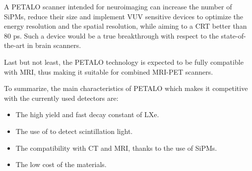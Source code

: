\documentclass[review]{elsarticle}
\begin{document}
A PETALO scanner intended for neuroimaging can increase the number of SiPMs, reduce their size and implement VUV sensitive devices to optimize the energy resolution and the spatial resolution, while aiming to a  CRT  better than 80 ps. Such a device would be a true breakthrough with respect to the state-of-the-art in brain scanners. 

Last but not least, the PETALO technology is expected to be fully compatible with MRI, thus making it suitable for combined MRI-PET scanners. 

To summarize, the main characteristics of PETALO which makes it competitive with the currently used detectors are:

\begin{itemize}
\item The high yield and fast decay constant of LXe.
\item The use of  to detect scintillation light.
\item The compatibility with CT and MRI, thanks to the use of SiPMs.
\item The low cost of the materials.
\end{itemize}



\section*{}


\end{document}
